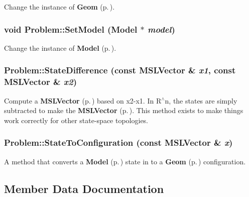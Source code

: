 Change the instance of {\bf Geom} {\rm (p.\,\pageref{class_Geom})}.

\subsubsection{\setlength{\rightskip}{0pt plus 5cm}void Problem::Set\-Model ({\bf Model} $\ast$ {\em model})}\label{class_Problem_a3}


Change the instance of {\bf Model} {\rm (p.\,\pageref{class_Model})}.

\subsubsection{ Problem::State\-Difference (const {\bf MSLVector} \& {\em x1}, const {\bf MSLVector} \& {\em x2})\hspace{0.3cm}{\tt  [virtual]}}\label{class_Problem_a10}


Compute a {\bf MSLVector} {\rm (p.\,\pageref{class_MSLVector})} based on x2-x1. In R$^\wedge$n, the states are simply subtracted to make the {\bf MSLVector} {\rm (p.\,\pageref{class_MSLVector})}. This method exists to make things work correctly for other state-space topologies.

\subsubsection{ Problem::State\-To\-Configuration (const {\bf MSLVector} \& {\em x})\hspace{0.3cm}{\tt  [virtual]}}\label{class_Problem_a9}


A method that converts a {\bf Model} {\rm (p.\,\pageref{class_Model})} state in to a {\bf Geom} {\rm (p.\,\pageref{class_Geom})} configuration.



\subsection{Member Data Documentation}
